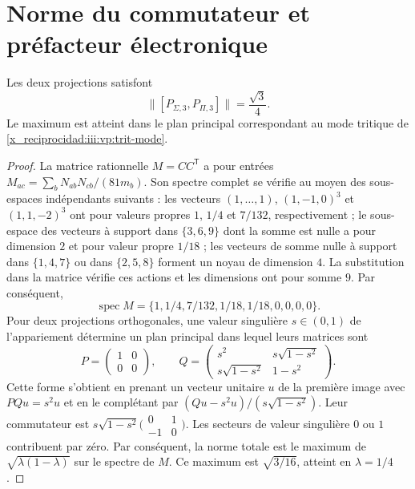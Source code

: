 \section{Norme du commutateur et préfacteur électronique}

\begin{theorem}
Les deux projections satisfont
\begin{equation}
 \bigl\|[P_{\Sigma,3},P_{\Pi,3}]\bigr\|=\frac{\sqrt3}{4}.
 \label{x_reciprocidad:iii:vp:prefactor}
\end{equation}
Le maximum est atteint dans le plan principal correspondant au mode
tritique de \eqref{x_reciprocidad:iii:vp:trit-mode}.
\end{theorem}
\begin{proof}
La matrice rationnelle $M=CC^{\mathsf T}$ a pour entrées $M_{ac}=\sum_bN_{ab}N_{cb}/(81m_b)$. Son spectre complet se vérifie au moyen des sous-espaces indépendants suivants : les vecteurs $(1,\ldots,1)$, $(1,-1,0)^3$ et $(1,1,-2)^3$ ont pour valeurs propres $1$, $1/4$ et $7/132$, respectivement ; le sous-espace des vecteurs à support dans $\{3,6,9\}$ dont la somme est nulle a pour dimension $2$ et pour valeur propre $1/18$ ; les vecteurs de somme nulle à support dans $\{1,4,7\}$ ou dans $\{2,5,8\}$ forment un noyau de dimension $4$. La substitution dans la matrice vérifie ces actions et les dimensions ont pour somme $9$. Par conséquent,
\[
 \operatorname{spec}M=
 \{1,1/4,7/132,1/18,1/18,0,0,0,0\}.
\]
Pour deux projections orthogonales, une valeur singulière $s\in(0,1)$ de
l’appariement détermine un plan principal dans lequel leurs matrices sont
\[
 P=\begin{pmatrix}1&0\\0&0\end{pmatrix},\qquad
 Q=\begin{pmatrix}s^2&s\sqrt{1-s^2}\\
 s\sqrt{1-s^2}&1-s^2\end{pmatrix}.
\]
Cette forme s’obtient en prenant un vecteur unitaire $u$ de la première
image avec $PQu=s^2u$ et en le complétant par
$(Qu-s^2u)/(s\sqrt{1-s^2})$. Leur commutateur est
$s\sqrt{1-s^2}\bigl(\begin{smallmatrix}0&1\\-1&0\end{smallmatrix}\bigr)$.
Les secteurs de valeur singulière $0$ ou $1$ contribuent par zéro.
Par conséquent, la norme totale est le maximum de
$\sqrt{\lambda(1-\lambda)}$ sur le spectre de $M$. Ce maximum
est $\sqrt{3/16}$, atteint en $\lambda=1/4$.
\end{proof}

